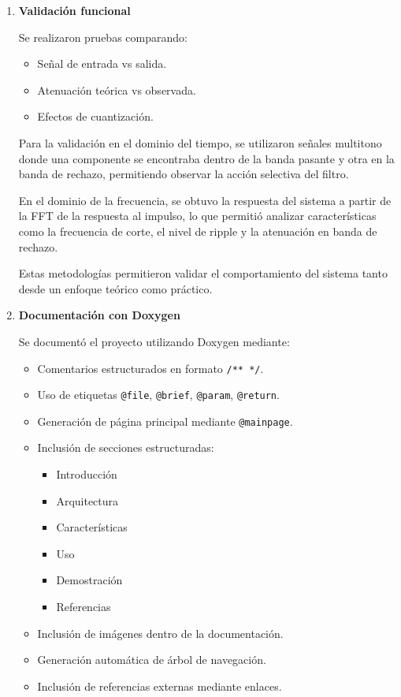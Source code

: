 \documentclass[a4,11pt]{article}
\begin{document}
\begin{enumerate}
\item \textbf{Validación funcional}

Se realizaron pruebas comparando:
\begin{itemize}
\item Señal de entrada vs salida.
\item Atenuación teórica vs observada.
\item Efectos de cuantización.
\end{itemize}

\par Para la validación en el dominio del tiempo, se utilizaron señales multitono donde una componente se encontraba dentro de la banda pasante y otra en la banda de rechazo, permitiendo observar la acción selectiva del filtro.

\par En el dominio de la frecuencia, se obtuvo la respuesta del sistema a partir de la FFT de la respuesta al impulso, lo que permitió analizar características como la frecuencia de corte, el nivel de ripple y la atenuación en banda de rechazo.

\par Estas metodologías permitieron validar el comportamiento del sistema tanto desde un enfoque teórico como práctico.

\item \textbf{Documentación con Doxygen}

Se documentó el proyecto utilizando Doxygen mediante:

\begin{itemize}
\item Comentarios estructurados en formato \texttt{/** */}.
\item Uso de etiquetas \texttt{@file}, \texttt{@brief}, \texttt{@param}, \texttt{@return}.
\item Generación de página principal mediante \texttt{@mainpage}.
\item Inclusión de secciones estructuradas:
    \begin{itemize}
    \item Introducción
    \item Arquitectura
    \item Características
    \item Uso
    \item Demostración
    \item Referencias
    \end{itemize}
\item Inclusión de imágenes dentro de la documentación.
\item Generación automática de árbol de navegación.
\item Inclusión de referencias externas mediante enlaces.
\end{itemize}


\end{enumerate}
\end{document}
